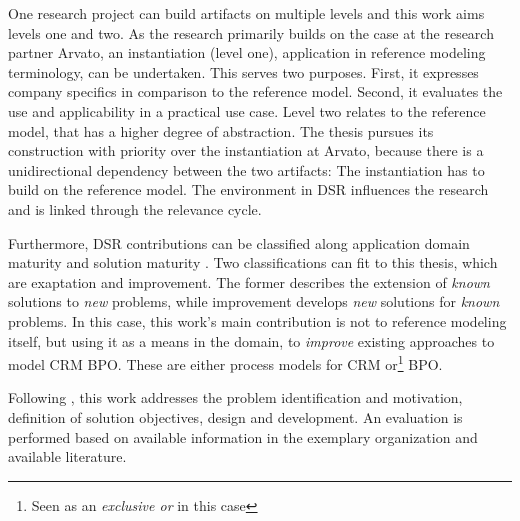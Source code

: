 One research project can build artifacts on multiple levels \citep{gregor2013positioning} and this work aims levels one and two. As the research primarily builds on the case at the research partner Arvato, an instantiation (level one), \viz application in reference modeling terminology, can be undertaken. This serves two purposes. First, it expresses company specifics in comparison to the reference model. Second, it evaluates the use and applicability in a practical use case.  Level two relates to the reference model, that has a higher degree of abstraction. The thesis pursues its construction with priority over the instantiation at Arvato, because there is a unidirectional dependency between the two artifacts: The instantiation has to build on the reference model. The environment in \acrshort{DSR} influences the research and is linked through the relevance cycle. 

Furthermore, \acrshort{DSR} contributions can be classified along application domain maturity and solution maturity \citep{gregor2013positioning}. Two classifications can fit to this thesis, which are exaptation and improvement. The former describes the extension of \textit{known} solutions to \textit{new} problems, while improvement develops \textit{new} solutions for \textit{known} problems. In this case, this work's main contribution is not to reference modeling itself, but using it as a means in the domain, to \textit{improve} existing approaches to model CRM BPO. These are either process models for CRM or\footnote{Seen as an \textit{exclusive or} in this case} BPO. 




Following \citeauthor{Hevner2004,Peffers2007}, this work addresses the problem identification and motivation, definition of solution objectives,  design and development. An evaluation is performed based on available information in the exemplary organization and available literature. 



